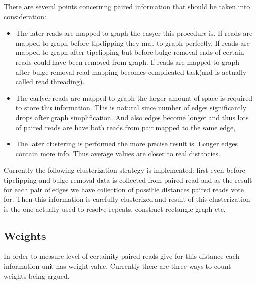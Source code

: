 \documentclass[14pt]{article}
\begin{document}
There are several points concerning paired information that should be taken into consideration:

\begin{itemize}
\item The later reads are mapped to graph the easyer this procedure is. If reads are mapped to graph before tipclipping they map to graph perfectly. If reads are mapped to graph after tipclipping but before bulge removal ends of certain reads could have been removed from graph. If reads are mapped to graph after bulge removal read mapping becomes complicated task(and is actually called read threading).

\item The earlyer reads are mapped to graph the larger amount of space is required to store this information. This is natural since number of edges significantly drops after graph simplification. And also edges become longer and thus lots of paired reads are have both reads from pair mapped to the same edge,

\item The later clustering is performed the more precise result is. Longer edges contain more info. Thus average values are closer to real distancies.
\end{itemize}

Currently the following clusterization strategy is implemented: first even before tipclipping and bulge removal data is collected from paired read and as the result for each pair of edges we have collection of possible distances paired reads vote for. Then this information is carefully clusterized and result of this clusterization is the one actually used to resolve repeats, construct rectangle graph etc.

\subsection{Weights}
In order to measure level of certainity paired reads give for this distance each information unit has weight value. Currently there are three ways to count weights being argued.
\end{document}
